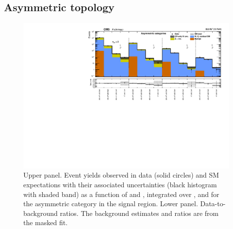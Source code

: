 \clearpage
\subsection{Asymmetric topology}

\begin{figure}[h!]
  \centering
  \caption{Upper panel. Event yields observed in data (solid circles)
    and SM expectations with their associated uncertainties (black
    histogram with shaded band) as a function of \nb and \scalht,
    integrated over \mht, and for the asymmetric \njet category
    in the signal region. Lower panel. Data-to-background ratios. The
    background estimates and ratios are from the masked fit. }
  \label{fig:mr_asym_pre}
  \includegraphics[width=1.\linewidth]{figures/results/36invfb/asym/summaryPlot_Asymmetric_prefit}
\end{figure}

